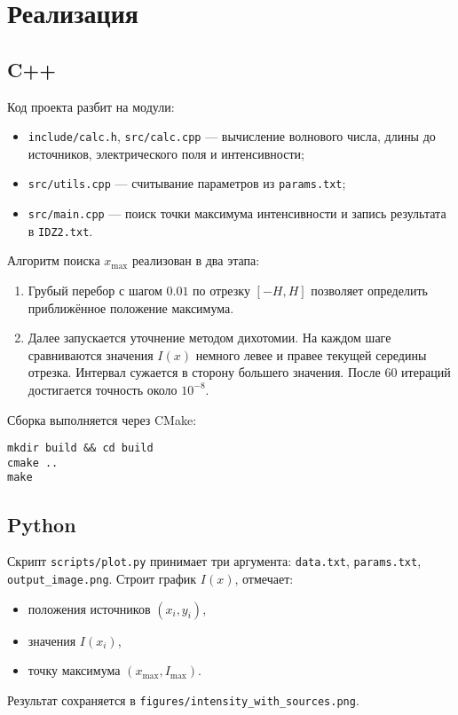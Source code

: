 \section{Реализация}
\subsection{C++}

Код проекта разбит на модули:
\begin{itemize}
  \item \texttt{include/calc.h}, \texttt{src/calc.cpp} — вычисление волнового числа, длины до источников, электрического поля и интенсивности;
  \item \texttt{src/utils.cpp} — считывание параметров из \texttt{params.txt};
  \item \texttt{src/main.cpp} — поиск точки максимума интенсивности и запись результата в \texttt{IDZ2.txt}.
\end{itemize}

Алгоритм поиска $x_{\max}$ реализован в два этапа:
\begin{enumerate}
  \item Грубый перебор с шагом $0.01$ по отрезку $[-H, H]$ позволяет определить приближённое положение максимума.
  \item Далее запускается уточнение методом дихотомии. На каждом шаге сравниваются значения $I(x)$ немного левее и правее текущей середины отрезка. Интервал сужается в сторону большего значения. После 60 итераций достигается точность около $10^{-8}$.
\end{enumerate}

Сборка выполняется через CMake:
\begin{verbatim}
mkdir build && cd build
cmake ..
make
\end{verbatim}

\subsection{Python}
Скрипт \texttt{scripts/plot.py} принимает три аргумента:
\texttt{data.txt}, \texttt{params.txt}, \texttt{output\_image.png}.
Строит график $I(x)$, отмечает:
\begin{itemize}
  \item положения источников $(x_i,y_i)$,
  \item значения $I(x_i)$,
  \item точку максимума $(x_{\max},I_{\max})$.
\end{itemize}
Результат сохраняется в \texttt{figures/intensity\_with\_sources.png}.
